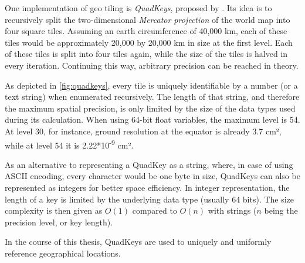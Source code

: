 One implementation of geo tiling is \textit{QuadKeys}, proposed by \cite{Schwartz2018}. Its idea is to recursively split the two-dimensional \textit{Mercator projection} of the world map into four square tiles. Assuming an earth circumference of 40,000 km, each of these tiles would be approximately 20,000 by 20,000 km in size at the first level. Each of these tiles is split into four tiles again, while the size of the tiles is halved in every iteration. Continuing this way, arbitrary precision can be reached in theory.

As depicted in \autoref{fig:quadkeys}, every tile is uniquely identifiable by a number (or a text string) when enumerated recursively. The length of that string, and therefore the maximum spatial precision, is only limited by the size of the data types used during its calculation. When using 64-bit float variables, the maximum level is 54. At level 30, for instance, ground resolution at the equator is already 3.7 cm², while at level 54 it is 2.22*10\textsuperscript{-9} cm².

As an alternative to representing a QuadKey as a string, where, in case of using ASCII encoding, every character would be one byte in size, QuadKeys can also be represented as integers for better space efficiency. In integer representation, the length of a key is limited by the underlying data type (usually 64 bits). The size complexity is then given as $O(1)$ compared to $O(n)$ with strings ($n$ being the precision level, or key length).

\par
\bigskip

In the course of this thesis, QuadKeys are used to uniquely and uniformly reference geographical locations. 